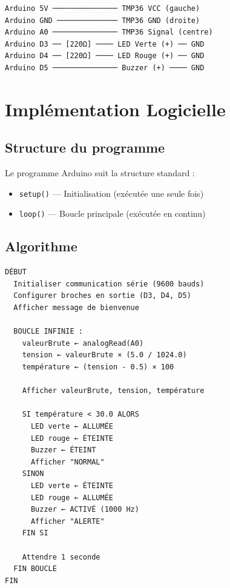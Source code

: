 \documentclass[12pt, a4paper]{article}
\begin{document}
\begin{verbatim}
Arduino 5V ─────────────── TMP36 VCC (gauche)
Arduino GND ────────────── TMP36 GND (droite)
Arduino A0 ─────────────── TMP36 Signal (centre)
Arduino D3 ── [220Ω] ──── LED Verte (+) ── GND
Arduino D4 ── [220Ω] ──── LED Rouge (+) ── GND
Arduino D5 ─────────────── Buzzer (+) ──── GND
\end{verbatim}

\section{Implémentation Logicielle}

\subsection{Structure du programme}

Le programme Arduino suit la structure standard :

\begin{itemize}
    \item \texttt{setup()} — Initialisation (exécutée une seule fois)
    \item \texttt{loop()} — Boucle principale (exécutée en continu)
\end{itemize}

\subsection{Algorithme}

\begin{verbatim}
DÉBUT
  Initialiser communication série (9600 bauds)
  Configurer broches en sortie (D3, D4, D5)
  Afficher message de bienvenue

  BOUCLE INFINIE :
    valeurBrute ← analogRead(A0)
    tension ← valeurBrute × (5.0 / 1024.0)
    température ← (tension - 0.5) × 100

    Afficher valeurBrute, tension, température

    SI température < 30.0 ALORS
      LED verte ← ALLUMÉE
      LED rouge ← ÉTEINTE
      Buzzer ← ÉTEINT
      Afficher "NORMAL"
    SINON
      LED verte ← ÉTEINTE
      LED rouge ← ALLUMÉE
      Buzzer ← ACTIVÉ (1000 Hz)
      Afficher "ALERTE"
    FIN SI

    Attendre 1 seconde
  FIN BOUCLE
FIN
\end{verbatim}
\end{document}
